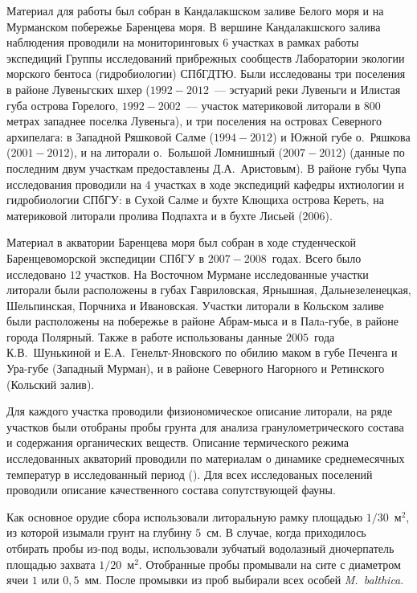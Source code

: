 Материал для работы был собран в Кандалакшском заливе Белого моря и на Мурманском побережье Баренцева моря.
В вершине Кандалакшского залива наблюдения проводили на мониторинговых $6$ участках в рамках работы экспедиций Группы исследований прибрежных сообществ Лаборатории экологии морского бентоса (гидробиологии) СПбГДТЮ. Были исследованы три поселения в районе Лувеньгских шхер ($1992 - 2012$~--- эстуарий реки Лувеньги и Илистая губа острова Горелого, $1992 - 2002$~--- участок материковой литорали в $800$ метрах западнее поселка Лувеньга), 
и три поселения на островах Северного архипелага: в Западной Ряшковой Салме ($1994 - 2012$) и Южной губе о.~Ряшкова ($2001 - 2012$), и на литорали о.~Большой Ломнишный ($2007 - 2012$) (данные по последним двум участкам предоставлены Д.\:А.~Аристовым). 
В районе губы Чупа исследования проводили на $4$ участках в ходе экспедиций кафедры ихтиологии и гидробиологии СПбГУ: в Сухой Салме и бухте Клющиха острова Кереть, на материковой литорали пролива Подпахта и в бухте Лисьей ($2006$).

Материал  в акватории Баренцева моря  был  собран    в ходе   студенческой Баренцевоморской экспедиции СПбГУ в $2007 - 2008$~годах. 
Всего было исследовано $12$ участков.
На Восточном   Мурмане исследованные участки литорали  были   расположены   в   губах   Гавриловская,  Ярнышная, Дальнезеленецкая, Шельпинская, Порчниха и Ивановская.
Участки литорали  в   Кольском   заливе   были  расположены на побережье в районе Абрам-мыса и в Палa-губе, в районе города Полярный. 
Также в работе использованы данные $2005$~года К.\:В.~Шунькиной и Е.\:А.~Генельт-Яновского по обилию маком в губе Печенга и Ура-губе (Западный Мурман), и в районе Северного Нагорного и Ретинского (Кольский залив).

Для каждого участка проводили физиономическое описание литорали, на ряде участков были отобраны пробы грунта для анализа гранулометрического состава и содержания органических веществ.
Описание термического режима исследованных акваторий проводили по материалам о динамике среднемесячных температур в исследованный период (\cite{KGZ_letopis, rp5_Kandalaksha, pinro}).
Для всех исследованых поселений проводили описание качественного состава сопутствующей фауны.

Как основное орудие сбора использовали литоральную рамку площадью $1/30$~м$^2$, из которой изымали грунт на глубину $5$~см. 
В случае, когда приходилось отбирать пробы из-под воды, использовали зубчатый водолазный дночерпатель площадью захвата $1/20$~м$^2$.
Отобранные пробы промывали на сите с диаметром ячеи $1$ или $0,5$~мм. 
После промывки из   проб   выбирали   всех   особей  {\it M.~balthica}.

